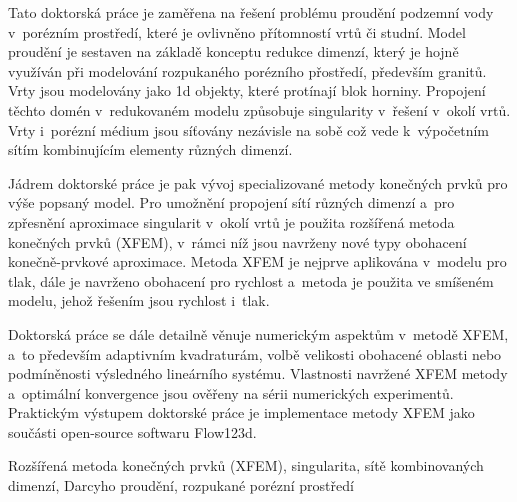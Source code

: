 \begin{abstractCZ}
Tato doktorská práce je zaměřena na řešení problému proudění podzemní vody v~porézním prostředí, které
je ovlivněno přítomností vrtů či studní. Model proudění je sestaven na základě konceptu redukce dimenzí,
který je hojně využíván při modelování rozpukaného porézního přostředí, především granitů.
Vrty jsou modelovány jako 1d objekty, které protínají blok horniny. 
Propojení těchto domén v~redukovaném modelu způsobuje singularity v~řešení v~okolí vrtů.
Vrty i~porézní médium jsou síťovány nezávisle na sobě což vede k~výpočetním sítím kombinujícím elementy
různých dimenzí.

Jádrem doktorské práce je pak vývoj specializované metody konečných prvků pro výše popsaný model. 
Pro umožnění propojení sítí různých dimenzí a~pro zpřesnění aproximace singularit v~okolí vrtů je 
použita rozšířená metoda konečných prvků (XFEM), v~rámci níž jsou navrženy nové typy obohacení
konečně-prvkové aproximace.
Metoda XFEM je nejprve aplikována v~modelu pro tlak, dále je navrženo obohacení pro rychlost a~metoda
je použita ve smíšeném modelu, jehož řešením jsou rychlost i~tlak.

Doktorská práce se dále detailně věnuje numerickým aspektům v~metodě XFEM, a~to především 
adaptivním kvadraturám, volbě velikosti obohacené oblasti nebo podmíněnosti výsledného lineárního systému.
Vlastnosti navržené XFEM metody a~optimální konvergence jsou ověřeny na sérii numerických experimentů.
Praktickým výstupem doktorské práce je implementace metody XFEM jako součásti open-source softwaru Flow123d.

\end{abstractCZ}

\begin{keywordsCZ}
Rozšířená metoda konečných prvků (XFEM), singularita, sítě kombinovaných dimenzí,
Darcyho proudění, rozpukané porézní prostředí
\end{keywordsCZ}

\vspace{2cm}

